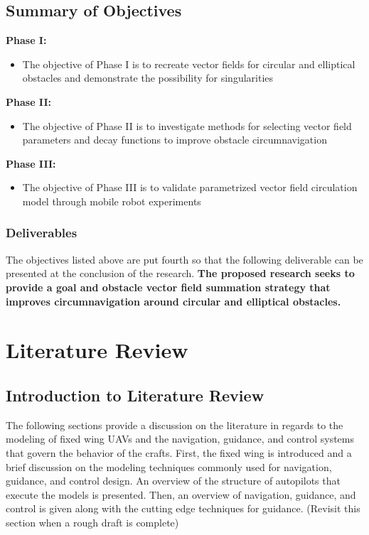 \documentclass[numbered,pdftex]{ohio-etd}
\begin{document}
\section{Summary of Objectives}
\textbf{Phase I:}
\begin{itemize}
\item The objective of Phase I is to recreate vector fields for circular and elliptical obstacles and demonstrate the possibility for singularities
\end{itemize}

\textbf{Phase II:}
\begin{itemize}
	\item The objective of Phase II is to investigate methods for selecting vector field parameters and decay functions to improve obstacle circumnavigation
\end{itemize}

\textbf{Phase III:}
\begin{itemize}
\item The objective of Phase III is to validate parametrized vector field circulation model through mobile robot experiments
\end{itemize}




\subsection{Deliverables}
The objectives listed above are put fourth so that the following deliverable can be presented at the conclusion of the research. \textbf{The proposed research seeks to provide a goal and obstacle vector field summation strategy that improves circumnavigation around circular and elliptical obstacles.}



\chapter{Literature Review}
\section{Introduction to Literature Review}

% 
%

The following sections provide a discussion on the literature in regards to the modeling of fixed wing UAVs and the navigation, guidance, and control systems that govern the behavior of the crafts. First, the fixed wing is introduced and a brief discussion on the modeling techniques commonly used for navigation, guidance, and control design. An overview of the structure of autopilots that execute the models is presented. Then, an overview of navigation, guidance, and control is given along with the cutting edge techniques for guidance. (Revisit this section when a rough draft is complete)
\end{document}
